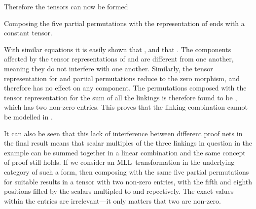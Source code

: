 \documentclass{LMCS}
\theoremstyle{plain}\newtheorem*{cLm}{Claim}
\newcommand{\mll}{MLL} \newcommand{\mall}{MALL}
\newcommand{\p}{} \newcommand{\N}{\mathbb{N}}
\begin{document}
\begin{enumerate}[label={\cW4 \& }\arabic*.]
\begin{center}
 \vspace{5mm}
  \end{center}
  Therefore the tensors  can now be formed
  
  \end{enumerate}
  
\noindent  Composing the five partial permutations with the representation of  ends with a constant tensor.
  
  With similar equations it is easily shown that , and that . The components affected by the tensor representations of  and  are different from one another, meaning they do not interfere with one another. Similarly, the tensor representation for  and partial permutations reduce to the zero morphism, and therefore has no effect on any component. The permutations composed with the tensor representation for the sum of all the linkings is therefore found to be , which has two non-zero entries. This proves that the linking combination cannot be modelled in .
  
  \p It can also be seen that this lack of interference between different proof nets in the final result means that scalar multiples of the three linkings in question in the example can be summed together in a linear combination and the same concept of proof still holds. If we consider an \mll~transformation  in the underlying category of such a form, then composing  with the same five partial permutations for suitable  results in a tensor with two non-zero entries, with the fifth and eighth positions filled by the scalars multipled to  and  repectively. The exact values within the entries are irrelevant---it only matters that two are non-zero.
  
\end{document}

